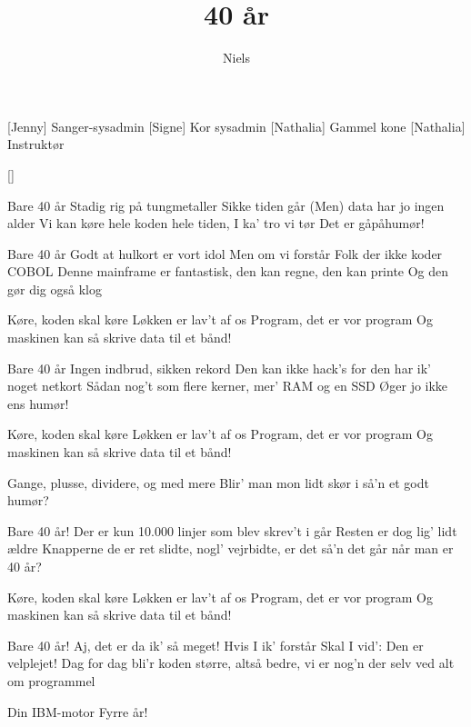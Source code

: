 \documentclass[a4paper,11pt]{article}
\title{40 år}
\author{Niels}
\begin{document}
\maketitle

\begin{roles}
[Jenny] Sanger-sysadmin
[Signe] Kor sysadmin
[Nathalia] Gammel kone
[Nathalia] Instruktør
\end{roles}

\begin{props}
[]
\end{props}

\begin{sketch}
\end{sketch}

\begin{song}
%
Bare 40 år
Stadig rig på tungmetaller
Sikke tiden går
(Men) data har jo ingen alder
Vi kan køre hele koden hele tiden, I ka' tro vi tør
Det er gåpåhumør!

Bare 40 år
Godt at hulkort er vort idol
Men om vi forstår
Folk der ikke koder COBOL
Denne mainframe er fantastisk, den kan regne, den kan printe
Og den gør dig også klog

%
Køre, koden skal køre
Løkken er lav't af os
Program, det er vor program
Og maskinen kan så skrive data til et bånd!

%
Bare 40 år
Ingen indbrud, sikken rekord
Den kan ikke hack's
for den har ik' noget netkort
Sådan nog't som flere kerner, mer' RAM og en SSD
Øger jo ikke ens humør!
    

%
Køre, koden skal køre
Løkken er lav't af os
Program, det er vor program
Og maskinen kan så skrive data til et bånd!


%
Gange, plusse, dividere, og med mere
Blir' man mon lidt skør i så'n et godt humør?

Bare 40 år!
Der er kun 10.000 linjer
som blev skrev't i går
Resten er dog lig' lidt ældre
Knapperne de er ret slidte, nogl' vejrbidte, er det så'n det går
når man er 40 år?
    
%
Køre, koden skal køre
Løkken er lav't af os
Program, det er vor program
Og maskinen kan så skrive data til et bånd!

%
Bare 40 år!
Aj, det er da ik' så meget!
Hvis I ik' forstår
Skal I vid': Den er velplejet!
Dag for dag bli'r koden større, altså bedre, vi er nog'n der
selv ved alt om programmel

Din IBM-motor
Fyrre år!

\end{song}
\end{document}
